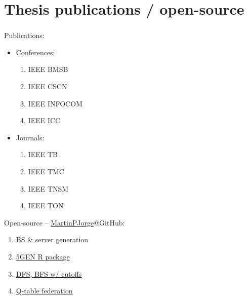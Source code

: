 \documentclass[aspectratio=169]{beamer}
\begin{document}
\section*{Thesis publications / open-source}
\begin{frame}
    \frametitle{\secname}

    \begin{minipage}{.5\textwidth}
        Publications:
        \begin{itemize}
            \item Conferences:
                \begin{enumerate}
                    \item IEEE BMSB~\cite{icc}
                    \item IEEE CSCN~\cite{5gen}
                    \item IEEE INFOCOM~\cite{okpi}
                    \item IEEE ICC~\cite{icc}
                \end{enumerate}
            \item Journals:
                \begin{enumerate}
                    \item IEEE TB~\cite{modelling-bs}
                    \item IEEE TMC~\cite{tmc}
                    \item IEEE TNSM~\cite{dqn}
                    \item IEEE TON~\cite{okpi-ton}
                \end{enumerate}
        \end{itemize}
    \end{minipage}
    \begin{minipage}{.45\textwidth}
        Open-source -- {\color{uc3mblue}\href{https://github.com/MartinPJorge/}{MartinPJorge}}@GitHub:
        \begin{enumerate}
            \item {\color{uc3mblue}\href{https://github.com/MartinPJorge/mec-generator/}{BS \& server generation}}
            \item {\color{uc3mblue}\href{https://github.com/MartinPJorge/mec-generator/tree/5g-infra-gen/}{5GEN R package}}
            \item {\color{uc3mblue}\href{https://github.com/MartinPJorge/placement/}{DFS, BFS w/ cutoffs}}
            \item {\color{uc3mblue}\href{https://github.com/MartinPJorge/5gt-federation/}{Q-table federation }}

\end{enumerate}
\end{minipage}
\end{frame}
\end{document}
